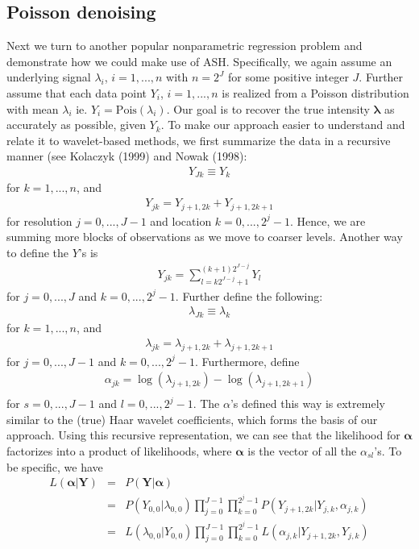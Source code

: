 \documentclass[12pt]{article}
\newcommand{\Ga}{\alpha}
\newcommand{\Gl}{\lambda}    \newcommand{\GL}{\Lambda}
\begin{document}
\subsection{Poisson denoising}
Next we turn to another popular nonparametric regression problem and demonstrate how we could make use of ASH. Specifically, we again assume an underlying signal $\Gl_i$, $i=1,...,n$ with $n=2^J$ for some positive integer $J$. Further assume that each data point $Y_i$, $i=1,...,n$ is realized from a Poisson distribution with mean $\Gl_i$ ie. $Y_i=\textrm{Pois}(\Gl_i)$. Our goal is to recover the true intensity $\bm{\Gl}$ as accurately as possible, given $Y_k$. To make our approach easier to understand and relate it to wavelet-based methods, we first summarize the data in a recursive manner (see Kolaczyk (1999) and Nowak (1998):
\begin{eqnarray}Y_{Jk}\equiv Y_k\end{eqnarray}
for $k=1,...,n$, and
\begin{eqnarray}Y_{jk}=Y_{j+1,2k}+Y_{j+1,2k+1}\end{eqnarray}
for resolution $j=0,...,J-1$ and location $k=0,...,2^j-1$. Hence, we are summing more blocks of observations as we move to coarser levels. Another way to define the $Y$'s is
\begin{eqnarray}Y_{jk}=\sum_{l=k2^{J-j}+1}^{(k+1)2^{J-j}}Y_l\end{eqnarray}
for $j=0,...,J$ and $k=0,...,2^j-1$.
Further define the following:
\begin{eqnarray}\Gl_{Jk}\equiv \Gl_k\end{eqnarray}
for $k=1,...,n$, and
\begin{eqnarray}\Gl_{jk}=\Gl_{j+1,2k}+\Gl_{j+1,2k+1}\end{eqnarray}
for $j=0,...,J-1$ and $k=0,...,2^j-1$. Furthermore, define
\begin{eqnarray}\label{eq:poisson wc}\Ga_{jk}=\log(\Gl_{j+1,2k})-\log(\Gl_{j+1,2k+1})\\\end{eqnarray}
for $s=0,...,J-1$ and $l=0,...,2^j-1$. The ${\Ga}$'s defined this way is extremely similar to the (true) Haar wavelet coefficients, which forms the basis of our approach. Using this recursive representation, we can see that the likelihood for $\bm{\Ga}$ factorizes into a product of likelihoods, where $\bm{\Ga}$ is the vector of all the $\Ga_{sl}$'s. To be specific, we have
\begin{eqnarray}
L(\bm{\Ga}|\mathbf{Y})&=&P(\mathbf{Y}|\bm{\Ga})\\
&=&P(Y_{0,0}|\Gl_{0,0})\prod_{j=0}^{J-1}\prod_{k=0}^{2^j-1}P(Y_{j+1,2k}|Y_{j,k},\Ga_{j,k})\\
&=&L(\Gl_{0,0}|Y_{0,0})\prod_{j=0}^{J-1}\prod_{k=0}^{2^j-1}L(\Ga_{j,k}|Y_{j+1,2k},Y_{j,k})
\end{eqnarray}
\end{document}

